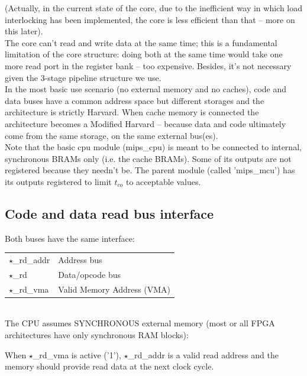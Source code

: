     (Actually, in the current state of the core, due to the inefficient way in
    which load interlocking has been implemented, the core is less efficient
    than that -- more on this later).\\

    The core can't read and write data at the same time; this is a fundamental 
    limitation of the core structure: doing both at the same time would take 
    one more read port in the register bank -- too expensive. Besides, it's not
    necessary given the 3-stage pipeline structure we use.\\

    In the most basic use scenario (no external memory and no caches), code and
    data buses have a common address space but different storages and the
    architecture is strictly Harvard. When cache memory is connected
    the architecture becomes a Modified Harvard -- because data and 
    code ultimately come from the same storage, on the same external 
    bus(es).\\

    Note that the basic cpu module (mips\_cpu) is meant to be connected to 
    internal, synchronous BRAMs only (i.e. the cache BRAMs). Some of its 
    outputs are not registered because they needn't be. The parent module 
    (called 'mips\_mcu') has its outputs registered to limit $t_{co}$ to 
    acceptable values.\\


\subsection{Code and data read bus interface}
\label{code_data_buses}
    Both buses have the same interface:\\
    
\begin{tabular}{ l l }
    $\star$\_rd\_addr  & Address bus\\ 
    $\star$\_rd        & Data/opcode bus\\ 
    $\star$\_rd\_vma   & Valid Memory Address (VMA)\\ 
\end{tabular}\\

    The CPU assumes SYNCHRONOUS external memory (most or all FPGA architectures
    have only synchronous RAM blocks):

    When $\star$\_rd\_vma is active ('1'), $\star$\_rd\_addr is a valid read address and the
    memory should provide read data at the next clock cycle.

